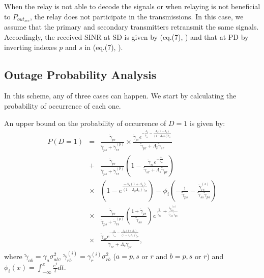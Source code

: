 \documentclass[conference,twocolumn]{IEEEtran}
\begin{document}
When the relay is not able to decode the signals or when relaying is not beneficial to $P_{out_{sec}}$, the relay does not participate in the transmissions. In this case, we assume that the primary and secondary transmitters retransmit the same signals. Accordingly, the received SINR at SD is given by (eq.(7), \cite{Jaafar_Globecom}) and that at PD by inverting indexes $p$ and $s$ in (eq.(7), \cite{Jaafar_Globecom}).


\subsection{Outage Probability Analysis}
In this scheme, any of three cases can happen. We start by calculating the probability of occurrence of each one.

An upper bound on the probability of occurrence of $D=1$ is given by:
\begin{eqnarray}
\label{eq:occurrence_D4_1}
\nonumber P\left(D=1\right)&=& \frac{\tilde{\gamma}_{ps}}{\tilde{\gamma}_{ps}+\tilde{\gamma}_{rs}^{(p)}} \times \frac{\tilde{\gamma}_{pr}e^{-\frac{\Lambda_p}{\tilde{\gamma}_{pr}}-\frac{\Lambda_s(1+\Lambda_p)}{(1-\Lambda_p\Lambda_s)\tilde{\gamma}_{sr}}}}{\tilde{\gamma}_{pr}+\Lambda_p \tilde{\gamma}_{sr}}\\
\nonumber &+& \frac{\tilde{\gamma}_{ps}}{\tilde{\gamma}_{ps}+\tilde{\gamma}_{rs}^{(p)}} \left(1-\frac{\tilde{\gamma}_{sr}e^{-\frac{\Lambda_s}{\tilde{\gamma}_{sr}}}}{\tilde{\gamma}_{sr}+\Lambda_s \tilde{\gamma}_{pr}} \right)\\
\nonumber &\times & \left( 1-e^{\frac{-\Lambda_s(1+\Lambda_p)}{(1-\Lambda_p \Lambda_s)\tilde{\gamma}_{sr}}} \right)-\phi_i\left( -\frac{1}{\tilde{\gamma}_{ps}}- \frac{\tilde{\gamma}_{rs}^{(s)}}{\tilde{\gamma}_{ss}\tilde{\gamma}_{ps}} \right)\\
\nonumber &\times & \frac{\tilde{\gamma}_{ps}}{\tilde{\gamma}_{ps}+\tilde{\gamma}_{rs}^{(p)}}  \left( \frac{1+\tilde{\gamma}_{ps}}{\tilde{\gamma}_{ss}} \right)e^{ \frac{1}{\tilde{\gamma}_{ps}} + \frac{\tilde{\gamma}_{rs}^{(s)}}{\tilde{\gamma}_{ss}\tilde{\gamma}_{ps}} }\\
&\times & \frac{\tilde{\gamma}_{sr}e^{-\frac{\Lambda_s}{\tilde{\gamma}_{sr}}-\frac{\Lambda_p(1+\Lambda_s)}{(1-\Lambda_p\Lambda_s)\tilde{\gamma}_{pr}}}}{\tilde{\gamma}_{sr}+\Lambda_s \tilde{\gamma}_{pr}},
\end{eqnarray}
where $\tilde{\gamma}_{ab}=\gamma_a \sigma_{ab}^2$, $\tilde{\gamma}_{rb}^{(i)}=\gamma_r^{(i)} \sigma_{rb}^2$ ($a=p,s$ or $r$ and $b=p,s$ or $r$) and  $\phi_i(x)=\int_{-\infty}^{x}{\frac{e^t}{t}dt}$.
\end{document}
